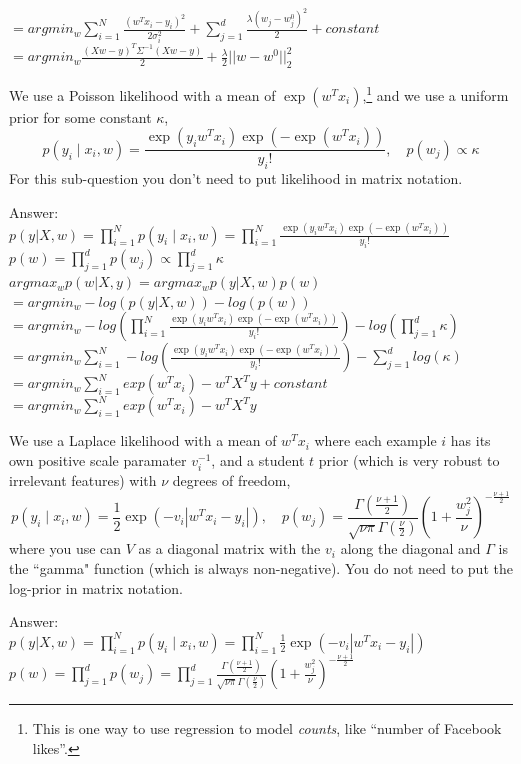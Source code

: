 \documentclass{article}
\def\ans#1{\par\gre{Answer: #1}}
\def\gre#1{{\color{gre}#1}}
\def\cond{\; | \;}
\begin{document}
{{\\
$=argmin_w \sum_{i=1}^{N}\frac{(w^Tx_i-y_i)^2}{2\sigma_i^2} + \sum_{j=1}^{d}\frac{\lambda(w_j-w^0_j)^2}{2} + constant$ 
\\
$=argmin_w \frac{(Xw-y)^T\Sigma^{-1}(Xw-y)}{2}+\frac{\lambda}{2}||w-w^0||^2_2$ 
}
\item We use a Poisson likelihood with a mean of $\exp(w^Tx_i)$,\footnote{This is one way to use regression to model \emph{counts}, like ``number of Facebook likes''.} and we use a uniform prior for some constant $\kappa$,
\[
p(y_i \cond x_i, w) = \frac{\exp(y_iw^Tx_i)\exp(-\exp(w^Tx_i))}{y_i!}, \quad p(w_j) \propto \kappa
\]
For this sub-question you don't need to put likelihood in matrix notation.
\ans{\\
$p(y|X,w)= \prod_{i=1}^{N}p(y_i \cond x_i,w) = \prod_{i=1}^{N}\frac{\exp(y_iw^Tx_i)\exp(-\exp(w^Tx_i))}{y_i!}$
\\
$p(w) = \prod_{j=1}^{d}p(w_j) \propto \prod_{j=1}^d \kappa$
\\
$argmax_w p(w|X,y)=argmax_w p(y|X,w)p(w)$
\\
$=argmin_w -log(p(y|X,w)) - log(p(w))$
\\
$=argmin_w -log(\prod_{i=1}^{N}\frac{\exp(y_iw^Tx_i)\exp(-\exp(w^Tx_i))}{y_i!})-log(\prod_{j=1}^d \kappa)$
\\
$=argmin_w \sum_{i=1}^{N} -log(\frac{\exp(y_iw^Tx_i)\exp(-\exp(w^Tx_i))}{y_i!})-\sum_{j=1}^{d}log(\kappa)$
\\
$=argmin_w \sum_{i=1}^{N} exp(w^Tx_i)- w^TX^Ty +constant$
\\
$=argmin_w \sum_{i=1}^{N} exp(w^Tx_i)- w^TX^Ty$
}
\item We use a Laplace likelihood with a mean of $w^Tx_i$ where each example $i$ has its own positive scale paramater $v_i^{-1}$, and a  student $t$ prior (which is very robust to irrelevant features) with $\nu$ degrees of freedom,
\[
p(y_i \cond x_i, w) = \frac 1 2 \exp\left(-v_i|w^Tx_i - y_i|\right), \quad  p(w_j) = \frac{\Gamma\left(\frac{\nu + 1}{2}\right)}{\sqrt{\nu\pi}\Gamma\left(\frac \nu 2\right)}\left(1 + \frac{w_j^2}{\nu}\right)^{-\frac{\nu+1}{2}}
\]
where you use can $V$ as a diagonal matrix with the $v_i$ along the diagonal and $\Gamma$ is the ``gamma" function (which is always non-negative). You do not need to put the log-prior in matrix notation.
\ans{\\
$p(y|X,w)= \prod_{i=1}^{N}p(y_i \cond x_i,w) =  \prod_{i=1}^{N}\frac 1 2 \exp\left(-v_i|w^Tx_i - y_i|\right)$
\\
$p(w) = \prod_{j=1}^{d}p(w_j) = \prod_{j=1}^{d}\frac{\Gamma\left(\frac{\nu + 1}{2}\right)}{\sqrt{\nu\pi}\Gamma\left(\frac \nu 2\right)}\left(1 + \frac{w_j^2}{\nu}\right)^{-\frac{\nu+1}{2}}$
}}
\end{document}
